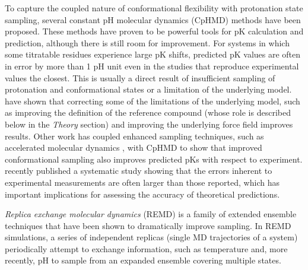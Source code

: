 To capture the coupled nature of conformational flexibility with protonation
state sampling, several constant pH molecular dynamics (CpHMD) methods have been
proposed. \cite{Baptista_Proteins_1997_v27_p523,
Baptista_JChemPhys_2002_v117_p4184, Burgi_Proteins_2002_v47_p469,
Lee_Proteins_2004_v56_p738, Borjesson_JPhysChemB_2004_v108_p13551,
Mongan_JComputChem_2004_v25_p2038, Khandogin_BiophysJ_2005_v89_p141} These
methods have proven to be powerful tools for pK calculation and
prediction, although there is still room for improvement.
\cite{Alexov_Proteins_2011_v79_p3260} For systems in which some titratable
residues experience large pK shifts, predicted pK values are often
in error by more than 1 pH unit even in the studies that reproduce experimental
values the closest. \cite{Alexov_Proteins_2011_v79_p3260} This is usually a
direct result of insufficient sampling of protonation and conformational states
or a limitation of the underlying model.
\citeauthor{Machuqueiro_Proteins_2011_v79_p3437} have shown that correcting some
of the limitations of the underlying model, such as improving the definition of
the reference compound (whose role is described below in the \emph{Theory}
section) and improving the underlying force field improves results.
\cite{Machuqueiro_Proteins_2011_v79_p3437} Other work has coupled enhanced
sampling techniques, such as accelerated molecular dynamics
\cite{Hamelberg_JChemPhys_2004_v120_p11919}, with CpHMD to show that improved
conformational sampling also improves predicted pKs with respect to
experiment.  \cite{Williams_JChemTheoryComput_2010_v6_p560}
\citeauthor{Webb_Proteins_2011_v79_p685} recently published a systematic study
showing that the errors inherent to experimental measurements are often larger
than those reported, which has important implications for assessing the accuracy
of theoretical predictions. \cite{Webb_Proteins_2011_v79_p685}

\emph{Replica exchange molecular dynamics} (REMD) is a family of extended
ensemble techniques that have been shown to dramatically improve sampling.
\cite{Sugita_ChemPhysLett_1999_v314_p141,
Pitera_ProcNatlAcadSci_2003_v100_p7587, Chodera_JChemPhys_2011_v135_p194110,
Nadler2008, Meng_JChemTheoryComput_2010_v6_p1401,
Meng_JChemTheoryComput_2011_v7_p2721} In REMD simulations, a series of
independent replicas (single MD trajectories of a system) periodically attempt
to exchange information, such as temperature
\cite{Sugita_ChemPhysLett_1999_v314_p141,
Pitera_ProcNatlAcadSci_2003_v100_p7587} and, more recently, pH
\cite{Itoh_Proteins_2011_v79_p3420, Wallace_JChemTheoryComput_2011_v7_p2617} to
sample from an expanded ensemble covering multiple states.

